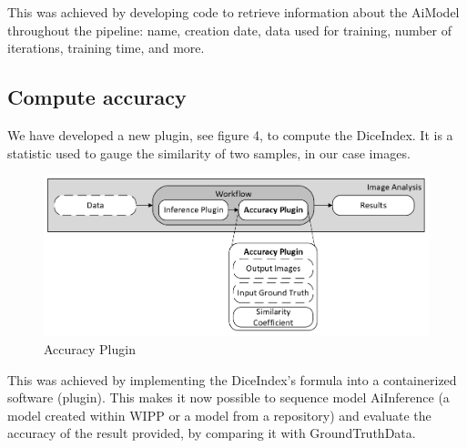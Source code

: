 This was achieved by developing code to retrieve information about the \Gls{AiModel}
throughout the pipeline: name, creation date, data used for training, number of
iterations, training time, and more.

\subsection{Compute accuracy}

We have developed a new plugin, see figure 4, to compute the \Gls{DiceIndex}.
It is a statistic used to gauge the similarity of two samples, in
our case images.

\begin{figure}[H]
  \centering
  \includegraphics[width=1.0\linewidth]{png/4_accuracy.png}
  \caption{Accuracy Plugin}
  \label{fig:4accuracy}
\end{figure}

This was achieved by implementing the \Gls{DiceIndex}'s formula into a containerized
software (plugin). This makes it now possible to sequence model \Gls{AiInference} (a
model created within \Gls{WIPP} or a model from a repository) and evaluate the
accuracy of the result provided, by comparing it with
\Gls{GroundTruthData}.
